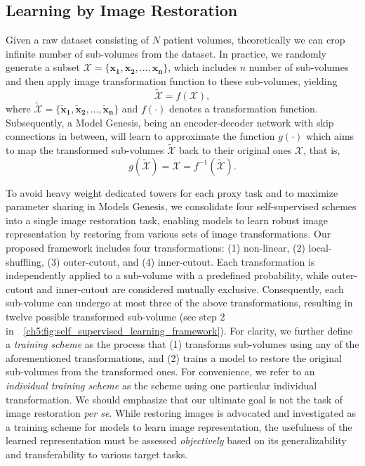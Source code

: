 \subsection{Learning by Image Restoration}

Given a raw dataset consisting of $N$ patient volumes, theoretically we can crop infinite number of sub-volumes from the dataset. In practice, we randomly generate a subset $\mathcal{X}=\{\mathbf{x_1},\mathbf{x_2},...,\mathbf{x_n}\}$, which includes $n$ number of sub-volumes and then apply image transformation function to these sub-volumes, yielding
\begin{equation}
    \tilde{\mathcal{X}} = f(\mathcal{X}),
\end{equation}
where $\tilde{\mathcal{X}}=\{\mathbf{\tilde{x}_1},\mathbf{\tilde{x}_2},...,\mathbf{\tilde{x}_n}\}$ and $f(\cdot)$ denotes a transformation function. Subsequently, a Model Genesis, being an encoder-decoder network with skip connections in between, will learn to approximate the function $g(\cdot)$ which aims to map the transformed sub-volumes $\tilde{\mathcal{X}}$ back to their original ones $\mathcal{X}$, that is,
\begin{equation}
    g(\tilde{\mathcal{X}}) = \mathcal{X} =  f^{-1}(\tilde{\mathcal{X}}).
\end{equation}

To avoid heavy weight dedicated towers for each proxy task and to maximize parameter sharing in Models Genesis, we consolidate four self-supervised schemes into a single image restoration task, enabling models to learn robust image representation by restoring from various sets of image transformations. Our proposed framework includes four transformations: (1) non-linear, (2) local-shuffling, (3) outer-cutout, and (4) inner-cutout.
Each transformation is independently applied to a sub-volume with a predefined probability, while outer-cutout and inner-cutout are considered mutually exclusive. Consequently, each sub-volume can undergo at most three of the above transformations, resulting in twelve possible transformed sub-volume (see step 2 in~\figurename~\ref{ch5:fig:self_supervised_learning_framework}). For clarity, we further define a {\em training scheme} as the process that (1) transforms sub-volumes using any of the aforementioned transformations, and (2) trains a model to restore the original sub-volumes from the transformed ones. For convenience, we refer to an {\em individual training scheme} as the scheme using one particular individual transformation.
We should emphasize that our ultimate goal is not the task of image restoration \textit{per se}. While restoring images is advocated and investigated as a training scheme for models to learn image representation, the usefulness of the learned representation must be assessed \textit{objectively} based on its generalizability and transferability to various target tasks.


